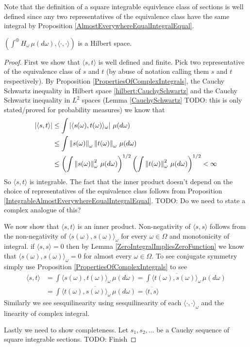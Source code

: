 Note that the definition of a square integrable equivlence class of sections is well defined since any two representatives of the equivalence class have the same integral by Proposition \ref{AlmostEverywhereEqualIntegralEqual}.  

\begin{prop}\label{hilbert:DirectIntegralIsHilbertSpace} $\left (\int^\oplus H_\omega \, \mu(d\omega), \langle \cdot, \cdot \rangle \right )$ is a Hilbert space.
\end{prop}
\begin{proof}
First we show that $\langle s, t \rangle$ is well defined and finite.  Pick two representative of the equivalence class of $s$ and $t$ (by abuse of notation calling them $s$ and $t$ respectively).  By Proposition \ref{PropertiesOfComplexIntegrals}, the Cauchy Schwartz inequality in Hilbert space \ref{hilbert:CauchySchwartz} and the Cauchy Schwartz inequality in $L^2$ spaces (Lemma \ref{CauchySchwartz} TODO: this is only stated/proved for probability measures) we know that 
\begin{align*}
\left \vert \langle s, t \rangle \right \vert &\leq \int \left \vert \langle s(\omega), t(\omega) \rangle_\omega \right \vert \, \mu(d\omega) \\
&\leq \int \left \lVert s(\omega) \right \rVert_\omega \left \lVert t(\omega) \right \rVert_\omega\, \mu(d\omega) \\
&\leq \left( \int \left \lVert s(\omega) \right \rVert^2_\omega \, \mu(d\omega) \right)^{1/2} \left(\int \left \lVert t(\omega) \right \rVert^2_\omega \, \mu(d\omega) \right)^{1/2} < \infty\\
\end{align*}
So $\langle s, t \rangle$ is integrable.  The fact that the inner product doesn't depend on the choice of representatives of the equivalence class follows from Proposition \ref{IntegrableAlmostEverywhereEqualIntegralEqual}.  TODO: Do we need to state a complex analogue of this?

We now show that $\langle s,t \rangle$ is an inner product.  Non-negativity of $\langle s, s \rangle$ follows from the non-negativity of $\langle s(\omega), s(\omega) \rangle_\omega$ for every $\omega \in \Omega$ and monotonicity of integral.  if $\langle s, s \rangle = 0$ then by Lemma \ref{ZeroIntegralImpliesZeroFunction} we know that $\langle s(\omega), s(\omega) \rangle_\omega = 0$ for almost every $\omega \in \Omega$.  To see conjugate symmetry simply use Proposition \ref{PropertiesOfComplexIntegrals} to see
\begin{align*}
\langle s, t \rangle &= \int \langle s(\omega), t(\omega) \rangle_\omega \, \mu(d\omega) = \int \overline{\langle t(\omega), s(\omega) \rangle_\omega} \, \mu(d\omega) \\
&= \overline{\int \langle t(\omega), s(\omega) \rangle_\omega\, \mu(d\omega)} = \overline{\langle t, s \rangle}
\end{align*}
Similarly we see sesquilinearity using sesquilinearity of each $\langle \cdot, \cdot \rangle_\omega$ and the linearity of complex integral.

Lastly we need to show completeness.  Let $s_1, s_2, \dotsc$ be a Cauchy sequence of square integrable sections.  TODO: Finish
\end{proof}

